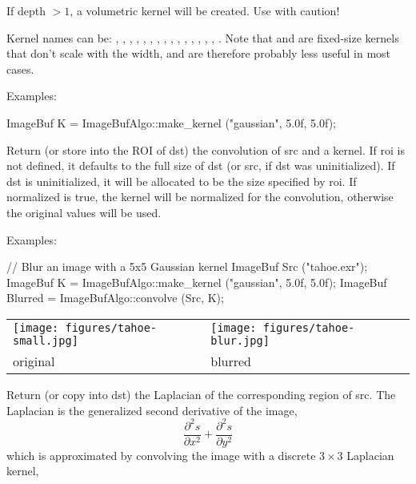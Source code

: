 If {\cf depth} $> 1$, a volumetric kernel will be created.  Use with
caution!

Kernel names can be: , , ,
, , , ,
, , , , ,
, , , . Note that
 and  are fixed-size kernels that don't
scale with the width, and are therefore probably less useful in most
cases.

\smallskip
\noindent Examples:
\begin{code}
    ImageBuf K = ImageBufAlgo::make_kernel ("gaussian", 5.0f, 5.0f);
\end{code}
\apiend


 

Return (or store into the ROI of {\cf dst}) the convolution of {\cf src} and
a kernel.  If {\cf roi} is not defined, it defaults to the full size of
{\cf dst} (or {\cf src}, if {\cf dst} was uninitialized). If {\cf dst} is
uninitialized, it will be allocated to be the size specified by {\cf roi}.
If {\cf normalized} is {\cf true}, the kernel will be normalized for the
convolution, otherwise the original values will be used.

\smallskip
\noindent Examples:
\begin{code}
    // Blur an image with a 5x5 Gaussian kernel
    ImageBuf Src ("tahoe.exr");
    ImageBuf K = ImageBufAlgo::make_kernel ("gaussian", 5.0f, 5.0f);
    ImageBuf Blurred = ImageBufAlgo::convolve (Src, K);
\end{code}

\spc \begin{tabular}{lll}
\texttt{[image: figures/tahoe-small.jpg]} &
\texttt{[image: figures/tahoe-blur.jpg]} \\
original & blurred \\
\end{tabular}
\apiend


 
Return (or copy into {\cf dst}) the Laplacian of the corresponding
region of {\cf src}. The Laplacian is the generalized second derivative
of the image,
$$\frac{\partial^2 s}{\partial x^2} + \frac{\partial^2 s}{\partial y^2}$$
which is approximated by convolving the image with a discrete $3 \times 3$
Laplacian kernel,

